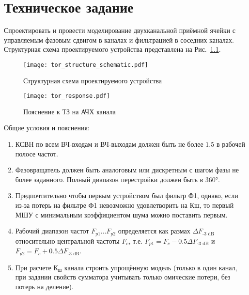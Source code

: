 \chapter{Техническое задание}

Спроектировать и провести моделирование двухканальной приёмной ячейки с управляемым фазовым сдвигом в каналах и фильтрацией в соседних каналах.
Структурная схема проектируемого устройства представлена на Рис.~\ref{fig:tor_structure_schematic}.

\begin{figure}[!ht]
    \centering
    \texttt{[image: tor\_structure\_schematic.pdf]}
    \caption{Структурная схема проектируемого устройства}%
    \label{fig:tor_structure_schematic}
\end{figure}

\begin{figure}[!ht]
    \centering
    \texttt{[image: tor\_response.pdf]}
    \caption{Пояснение к ТЗ на АЧХ канала}%
    \label{fig:tor_response}
\end{figure}

Общие условия и пояснения:
\begin{enumerate}
    \item
        КСВН по всем ВЧ-входам и ВЧ-выходам должен быть не более $1.5$ в рабочей полосе частот.
    \item
        Фазовращатель должен быть аналоговым или дискретным с шагом фазы не более заданного.
        Полный диапазон перестройки должен быть в 360°.
    \item
        Предпочтительно чтобы первым устройством был фильтр Ф1, однако, если из-за потерь на фильтре Ф1 невозможно удовлетворить на Кш, то первый МШУ с минимальным коэффициентом шума можно поставить первым.
    \item
        Рабочий диапазон частот $F_{p1} \ldots F_{p2}$ определяется как размах $\Delta F_\text{-3~dB}$ относительно центральной частоты $F_c$, т.е. $F_{p1} = F_c - 0.5 \Delta F_\text{-3~dB}$ и $F_{p2} = F_c + 0.5 \Delta F_\text{-3~dB}$.
    \item
        При расчете $К_\text{ш}$ канала строить упрощённую модель (только в один канал, при задании свойств сумматора учитывать только омические потери, без потерь на деление).
\end{enumerate}